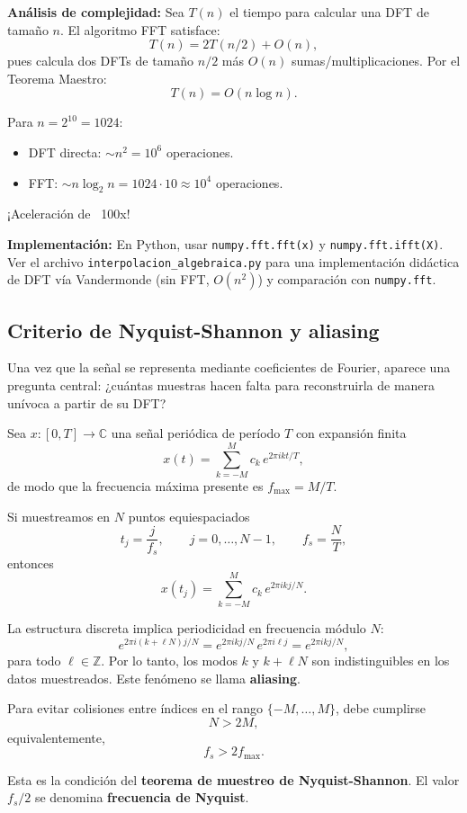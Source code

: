 \documentclass[a4paper,11pt]{report}
\begin{document}
\textbf{Análisis de complejidad:} Sea $T(n)$ el tiempo para calcular una DFT de tamaño $n$. El algoritmo FFT satisface:
\[
T(n) = 2T(n/2) + O(n),
\]
pues calcula dos DFTs de tamaño $n/2$ más $O(n)$ sumas/multiplicaciones. Por el Teorema Maestro:
\[
T(n) = O(n \log n).
\]

Para $n = 2^{10} = 1024$:
\begin{itemize}
\item DFT directa: $\sim n^2 = 10^6$ operaciones.
\item FFT: $\sim n \log_2 n = 1024 \cdot 10 \approx 10^4$ operaciones.
\end{itemize}
¡Aceleración de ~100x!

\textbf{Implementación:} En Python, usar \texttt{numpy.fft.fft(x)} y \texttt{numpy.fft.ifft(X)}. Ver el archivo \texttt{interpolacion\_algebraica.py} para una implementación didáctica de DFT vía Vandermonde (sin FFT, $O(n^2)$) y comparación con \texttt{numpy.fft}.

\subsection{Criterio de Nyquist-Shannon y aliasing}

Una vez que la señal se representa mediante coeficientes de Fourier, aparece una pregunta central: ¿cuántas muestras hacen falta para reconstruirla de manera unívoca a partir de su DFT?

Sea $x:[0,T]\to\mathbb{C}$ una señal periódica de período $T$ con expansión finita
\[
x(t)=\sum_{k=-M}^{M} c_k\,e^{2\pi i k t/T},
\]
de modo que la frecuencia máxima presente es $f_{\max}=M/T$.

Si muestreamos en $N$ puntos equiespaciados
\[
t_j=\frac{j}{f_s},\qquad j=0,\ldots,N-1,\qquad f_s=\frac{N}{T},
\]
entonces
\[
x(t_j)=\sum_{k=-M}^{M} c_k\,e^{2\pi i k j/N}.
\]

La estructura discreta implica periodicidad en frecuencia módulo $N$:
\[
e^{2\pi i (k+\ell N)j/N}=e^{2\pi i kj/N}\,e^{2\pi i\ell j}=e^{2\pi i kj/N},
\]
para todo $\ell\in\mathbb{Z}$. Por lo tanto, los modos $k$ y $k+\ell N$ son indistinguibles en los datos muestreados. Este fenómeno se llama \textbf{aliasing}.

Para evitar colisiones entre índices en el rango $\{-M,\ldots,M\}$, debe cumplirse
\[
N>2M,
\]
equivalentemente,
\[
\boxed{\,f_s>2f_{\max}.\,}
\]

Esta es la condición del \textbf{teorema de muestreo de Nyquist-Shannon}. El valor $f_s/2$ se denomina \textbf{frecuencia de Nyquist}.
\end{document}
